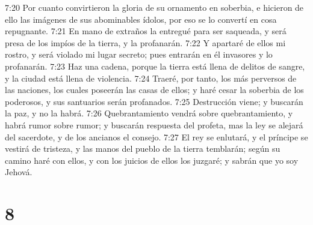 7:20 Por cuanto convirtieron la gloria de su ornamento en soberbia, e hicieron de ello las imágenes de sus abominables ídolos, por eso se lo convertí en cosa repugnante.  
7:21 En mano de extraños la entregué para ser saqueada, y será presa de los impíos de la tierra, y la profanarán.  
7:22 Y apartaré de ellos mi rostro, y será violado mi lugar secreto; pues entrarán en él invasores y lo profanarán.  
7:23 Haz una cadena, porque la tierra está llena de delitos de sangre, y la ciudad está llena de violencia.  
7:24 Traeré, por tanto, los más perversos de las naciones, los cuales poseerán las casas de ellos; y haré cesar la soberbia de los poderosos, y sus santuarios serán profanados.  
7:25 Destrucción viene; y buscarán la paz, y no la habrá.  
7:26 Quebrantamiento vendrá sobre quebrantamiento, y habrá rumor sobre rumor; y buscarán respuesta del profeta, mas la ley se alejará del sacerdote, y de los ancianos el consejo.  
7:27 El rey se enlutará, y el príncipe se vestirá de tristeza, y las manos del pueblo de la tierra temblarán; según su camino haré con ellos, y con los juicios de ellos los juzgaré; y sabrán que yo soy Jehová.  

\chapter{8}

